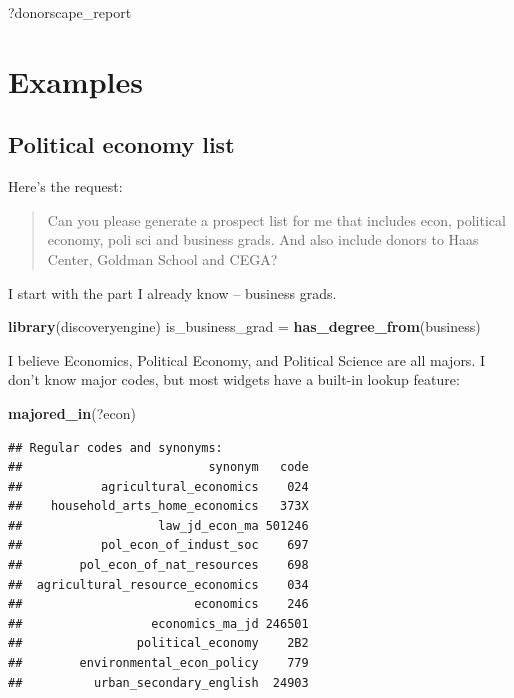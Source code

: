 \documentclass[]{book}
\newenvironment{Shaded}{\begin{snugshade}}{\end{snugshade}}
\newcommand{\KeywordTok}[1]{\textcolor[rgb]{0.13,0.29,0.53}{\textbf{#1}}}
\newcommand{\NormalTok}[1]{#1}
\newcommand{\StringTok}[1]{\textcolor[rgb]{0.31,0.60,0.02}{#1}}
\begin{document}
\begin{Shaded}
\begin{Highlighting}[]
\NormalTok{?donorscape_report}
\end{Highlighting}
\end{Shaded}

\hypertarget{part-examples}{%
\part{Examples}\label{part-examples}}

\hypertarget{ex-political-economy}{%
\chapter{Political economy list}\label{ex-political-economy}}

Here's the request:

\begin{quote}
Can you please generate a prospect list for me that includes econ, political economy, poli sci and business grads. And also include donors to Haas Center, Goldman School and CEGA?
\end{quote}

I start with the part I already know -- business grads.

\begin{Shaded}
\begin{Highlighting}[]
\KeywordTok{library}\NormalTok{(discoveryengine)}
\NormalTok{is_business_grad =}\StringTok{ }\KeywordTok{has_degree_from}\NormalTok{(business)}
\end{Highlighting}
\end{Shaded}

I believe Economics, Political Economy, and Political Science are all majors. I don't know major codes, but most widgets have a built-in lookup feature:

\begin{Shaded}
\begin{Highlighting}[]
\KeywordTok{majored_in}\NormalTok{(?econ)}
\end{Highlighting}
\end{Shaded}

\begin{verbatim}
## Regular codes and synonyms:
##                          synonym   code
##           agricultural_economics    024
##    household_arts_home_economics   373X
##                   law_jd_econ_ma 501246
##           pol_econ_of_indust_soc    697
##        pol_econ_of_nat_resources    698
##  agricultural_resource_economics    034
##                        economics    246
##                  economics_ma_jd 246501
##                political_economy    2B2
##        environmental_econ_policy    779
##          urban_secondary_english  24903
\end{verbatim}
\end{document}
